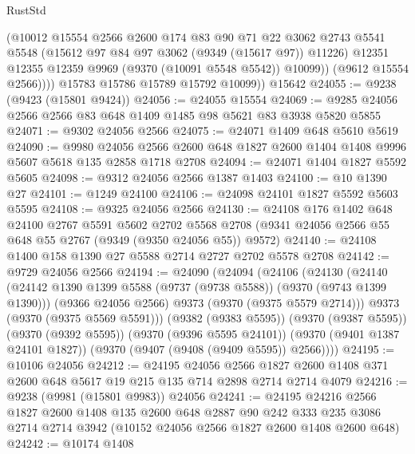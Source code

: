 \begin{lexlean}{RustStd}
\begin{coremodule}
                (@10012
                  @15554
                  @2566
                  @2600
                  @174
                  @83
                  @90
                  @71
                  @22
                  @3062
                  @2743
                  @5541
                  @5548
                  (@15612 @97 @84 @97 @3062 (@9349 (@15617 @97)) @11226)
                  @12351
                  @12355
                  @12359
                  @9969
                  (@9370 (@10091 @5548 @5542))
                  @10099))
              (@9612 @15554 @2566))))
        @15783
        @15786
        @15789
        @15792
        @10099))
    @15642
@24055 := @9238 (@9423 (@15801 @9424))
@24056 := @24055 @15554
@24069 := @9285 @24056 @2566 @2566 @83 @648 @1409 @1485 @98 @5621 @83 @3938 @5820 @5855
@24071 := @9302 @24056 @2566
@24075 := @24071 @1409 @648 @5610 @5619
@24090 := @9980
    @24056
    @2566
    @2600
    @648
    @1827
    @2600
    @1404
    @1408
    @9996
    @5607
    @5618
    @135
    @2858
    @1718
    @2708
@24094 := @24071 @1404 @1827 @5592 @5605
@24098 := @9312 @24056 @2566 @1387 @1403
@24100 := @10 @1390 @27
@24101 := @1249 @24100
@24106 := @24098 @24101 @1827 @5592 @5603 @5595
@24108 := @9325 @24056 @2566
@24130 := @24108
    @176
    @1402
    @648
    @24100
    @2767
    @5591
    @5602
    @2702
    @5568
    @2708
    (@9341 @24056 @2566 @55 @648 @55 @2767 (@9349 (@9350 @24056 @55)) @9572)
@24140 := @24108 @1400 @158 @1390 @27 @5588 @2714 @2727 @2702 @5578 @2708
@24142 := @9729 @24056 @2566
@24194 := @24090
    (@24094
      (@24106
        (@24130
          (@24140
            (@24142 @1390 @1399 @5588 (@9737 (@9738 @5588)) (@9370 (@9743 @1399 @1390)))
            (@9366 @24056 @2566)
            @9373
            (@9370 (@9375 @5579 @2714)))
          @9373
          (@9370 (@9375 @5569 @5591)))
        (@9382 (@9383 @5595))
        (@9370 (@9387 @5595))
        (@9370 (@9392 @5595))
        (@9370 (@9396 @5595 @24101))
        (@9370 (@9401 @1387 @24101 @1827))
        (@9370 (@9407 (@9408 (@9409 @5595)) @2566))))
@24195 := @10106 @24056
@24212 := @24195
    @24056
    @2566
    @1827
    @2600
    @1408
    @371
    @2600
    @648
    @5617
    @19
    @215
    @135
    @714
    @2898
    @2714
    @2714
    @4079
@24216 := @9238 (@9981 (@15801 @9983)) @24056
@24241 := @24195
    @24216
    @2566
    @1827
    @2600
    @1408
    @135
    @2600
    @648
    @2887
    @90
    @242
    @333
    @235
    @3086
    @2714
    @2714
    @3942
    (@10152 @24056 @2566 @1827 @2600 @1408 @2600 @648)
@24242 := @10174 @1408

\end{coremodule}
\end{lexlean}
